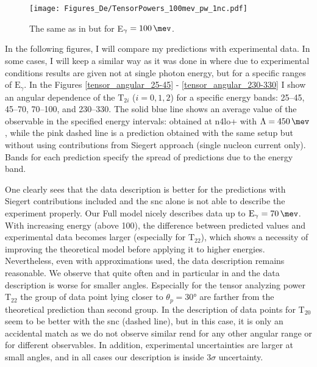    \begin{figure}[h]
        \begin{center}
        \texttt{[image: Figures\_De/TensorPowers\_100mev\_pw\_1nc.pdf]}
        \end{center}
        \caption{The same as in  but for E$_\gamma=\SI{100}{\mev}$.}
        \label{tensor_pw_1nc_100mev}
    \end{figure}

    
    In the following figures, I will compare my predictions with experimental data.
    In some cases, I will keep a similar way as it was done
    in \cite{rachek2007} where due to experimental conditions results are given not at single photon energy,
    but for a specific ranges of $\text{E}_\gamma$.
    In the Figures \ref{tensor_angular_25-45} - \ref{tensor_angular_230-330}
    I show an angular dependence of the $\text{T}_{2i}$ ($i=0,1,2$) for a specific energy bands:
    \SIrange[range-phrase=--]{25}{45}{\mev}, \SIrange[range-phrase=--]{45}{70}{\mev},
    \SIrange[range-phrase=--]{70}{100}{\mev}, and \SIrange[range-phrase=--]{230}{330}{\mev}.
    The solid blue line shows an average value of the observable in the specified energy intervals:
    obtained at \gls{n4lo+} with $\Lambda=\SI{450}{\mev}$, while the pink dashed line is a prediction
    obtained with the same setup but without using contributions from Siegert approach
    (single nucleon current only). Bands for each prediction specify the spread of
    predictions due to the energy band.
    
    One clearly sees that the data description is better for the predictions with Siegert contributions included
    and the \gls{snc} alone is not able to describe the experiment properly.
    Our Full model nicely describes data up to $\text{E}_\gamma = \SI{70}{\mev}$.
    With increasing energy (above \SI{100}{\mev}),
    the difference between predicted values and experimental data becomes larger
    (especially for $\text{T}_{22}$), 
    which shows a necessity of improving the theoretical model before applying it to 
    higher energies. Nevertheless, even with approximations used,
    the data description remains reasonable. 
    We observe that quite often and in particular in  and 
    the data description is worse for smaller angles. Especially for the tensor analyzing power T$_{22}$
    the group of data point lying closer to $\theta_p = \ang{30}$ are farther 
    from the theoretical prediction than second group.
    In  the description of data points for T$_{20}$ seem to be better
    with the \gls{snc} (dashed line), but in this case, it is only an accidental match as we do not observe similar rend for any other angular range or for different observables.
    In addition, experimental uncertainties are larger at small angles, and in all cases 
    our description is inside 3$\sigma$ uncertainty.
    




